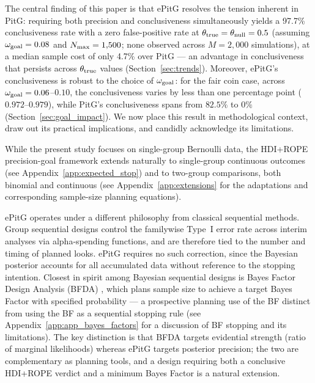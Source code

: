 The central finding of this paper is that ePitG resolves the tension inherent in
PitG: requiring both precision and conclusiveness simultaneously yields a 97.7\%
conclusiveness rate with a zero false-positive rate at
$\theta_{\rm true}=\theta_{\rm null}=0.5$ (assuming $\omega_{\rm goal}=0.08$ and $N_{\rm max}=1{,}500$;
none observed across $M=2{,}000$ simulations),
at a median sample cost of only 4.7\% over PitG --- an advantage in conclusiveness that persists across
$\theta_{\rm true}$ values (Section~\ref{sec:trends}).
Moreover, ePitG's conclusiveness is robust to the choice of $\omega_{\rm goal}$:
for the fair coin case, across $\omega_{\rm goal}=0.06$--$0.10$, the conclusiveness varies by less than one percentage
point ($0.972$--$0.979$), while PitG's conclusiveness spans from $82.5\%$ to
$0\%$ (Section~\ref{sec:goal_impact}).
We now place this result in methodological context, draw out its
practical implications, and candidly acknowledge its limitations.

While the present study focuses on single-group Bernoulli data, the HDI+ROPE
precision-goal framework extends naturally to single-group continuous outcomes
(see Appendix~\ref{app:expected_stop}) and to two-group comparisons, both binomial
and continuous (see Appendix~\ref{app:extensions} for the adaptations and
corresponding sample-size planning equations).

ePitG operates under a different philosophy from classical sequential methods.
Group sequential designs \citep{jennison2000} control the familywise Type~I error rate
across interim analyses via alpha-spending functions, and are therefore tied to the
number and timing of planned looks.
ePitG requires no such correction, since the Bayesian posterior accounts for all
accumulated data without reference to the stopping intention.
Closest in spirit among Bayesian sequential designs is Bayes Factor Design Analysis
(BFDA) \citep{schonbrodt2018}, which plans sample size to achieve a target Bayes Factor
with specified probability --- a prospective planning use of the BF distinct from
using the BF as a sequential stopping rule (see Appendix~\ref{app:app_bayes_factors}
for a discussion of BF stopping and its limitations).
The key distinction is that BFDA targets evidential strength (ratio of marginal
likelihoods) whereas ePitG targets posterior precision; the two are complementary
as planning tools, and a design requiring both a conclusive HDI+ROPE verdict and a
minimum Bayes Factor is a natural extension.

